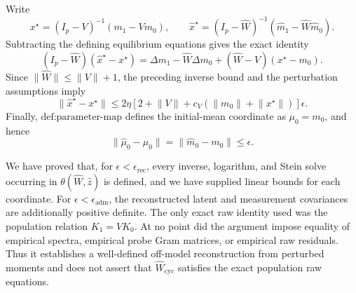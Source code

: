 Write
\[
 x^\star=(I_p-V)^{-1}(m_1-Vm_0),
 \qquad
 \widehat x^\star=(I_p-\widehat W)^{-1}
 (\widehat m_1-\widehat W\widehat m_0).
\]
Subtracting the defining equilibrium equations gives the exact identity
\[
 (I_p-\widehat W)(\widehat x^\star-x^\star)
 =\Delta m_1-\widehat W\Delta m_0
  +(\widehat W-V)(x^\star-m_0).
\]
Since \(\lVert\widehat W\rVert\le\lVert V\rVert+1\), the preceding inverse bound and the perturbation assumptions imply
\[
 \lVert\widehat x^\star-x^\star\rVert
 \le2\eta\left[2+\lVert V\rVert
 +c_V(\lVert m_0\rVert+\lVert x^\star\rVert)\right]\epsilon.
\]
Finally, \(\text{def:parameter-map}\) defines the initial-mean coordinate as \(\mu_0=m_0\), and hence
\[
 \lVert\widehat\mu_0-\mu_0\rVert
 =\lVert\widehat m_0-m_0\rVert
 \le\epsilon.
\]

We have proved that, for \(\epsilon<\epsilon_{\mathrm{rec}}\), every inverse, logarithm, and Stein solve occurring in \(\theta(\widehat W,\widehat z)\) is defined, and we have supplied linear bounds for each coordinate.  For \(\epsilon<\epsilon_{\mathrm{adm}}\), the reconstructed latent and measurement covariances are additionally positive definite.  The only exact raw identity used was the population relation \(K_1=VK_0\).  At no point did the argument impose equality of empirical spectra, empirical probe Gram matrices, or empirical raw residuals.  Thus it establishes a well-defined off-model reconstruction from perturbed moments and does not assert that \(\widehat W_{\mathrm{cyc}}\) satisfies the exact population raw equations.
